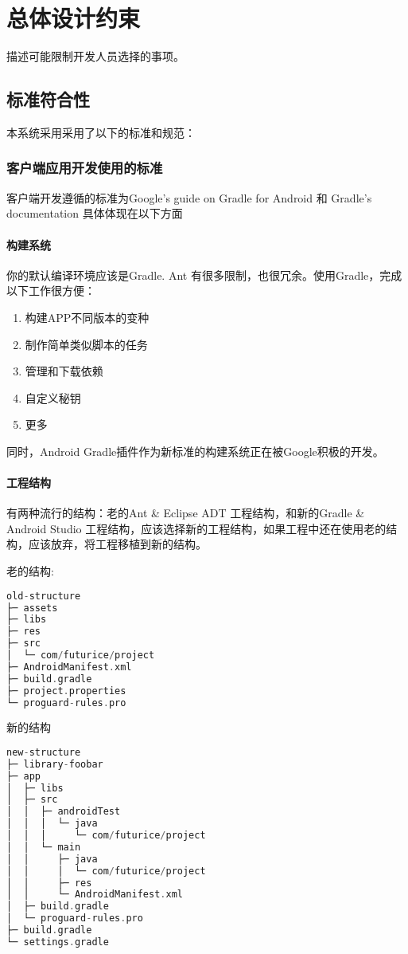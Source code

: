 \chapter{总体设计约束}

描述可能限制开发人员选择的事项。

\section{标准符合性}
本系统采用采用了以下的标准和规范：
\subsection{客户端应用开发使用的标准}
客户端开发遵循的标准为Google's guide on Gradle for Android 和 Gradle's documentation
具体体现在以下方面
\subsubsection{构建系统}
你的默认编译环境应该是Gradle.
Ant 有很多限制，也很冗余。使用Gradle，完成以下工作很方便：
\begin{enumerate} 
	\item 构建APP不同版本的变种
	\item 制作简单类似脚本的任务
	\item 管理和下载依赖
	\item 自定义秘钥
	\item 更多
\end{enumerate}

同时，Android Gradle插件作为新标准的构建系统正在被Google积极的开发。
\subsubsection{工程结构}
有两种流行的结构：老的Ant \& Eclipse ADT 工程结构，和新的Gradle \& Android Studio 工程结构，应该选择新的工程结构，如果工程中还在使用老的结构，应该放弃，将工程移植到新的结构。

老的结构:
\begin{lstlisting}[language=C]
old-structure  
├─ assets  
├─ libs  
├─ res  
├─ src  
│  └─ com/futurice/project  
├─ AndroidManifest.xml  
├─ build.gradle  
├─ project.properties  
└─ proguard-rules.pro  
\end{lstlisting}
新的结构
\begin{lstlisting}[language=C]
new-structure  
├─ library-foobar  
├─ app  
│  ├─ libs  
│  ├─ src  
│  │  ├─ androidTest  
│  │  │  └─ java  
│  │  │     └─ com/futurice/project  
│  │  └─ main  
│  │     ├─ java  
│  │     │  └─ com/futurice/project  
│  │     ├─ res  
│  │     └─ AndroidManifest.xml  
│  ├─ build.gradle  
│  └─ proguard-rules.pro  
├─ build.gradle  
└─ settings.gradle  
\end{lstlisting}


